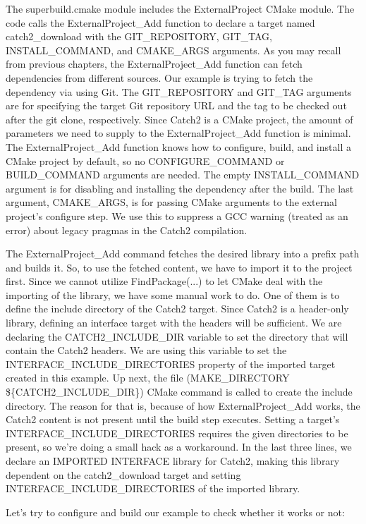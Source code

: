 The superbuild.cmake module includes the ExternalProject CMake module. The code calls the ExternalProject\_Add function to declare a target named catch2\_download with the GIT\_REPOSITORY, GIT\_TAG, INSTALL\_COMMAND, and CMAKE\_ARGS arguments. As you may recall from previous chapters, the ExternalProject\_Add function can fetch dependencies from different sources. Our example is trying to fetch the dependency via using Git. The GIT\_REPOSITORY and GIT\_TAG arguments are for specifying the target Git repository URL and the tag to be checked out after the git clone, respectively. Since Catch2 is a CMake project, the amount of parameters we need to supply to the ExternalProject\_Add function is minimal. The ExternalProject\_Add function knows how to configure, build, and install a CMake project by default, so no CONFIGURE\_COMMAND or BUILD\_COMMAND arguments are needed. The empty INSTALL\_COMMAND argument is for disabling and installing the dependency after the build. The last argument, CMAKE\_ARGS, is for passing CMake arguments to the external project's configure step. We use this to suppress a GCC warning (treated as an error) about legacy pragmas in the Catch2 compilation.

The ExternalProject\_Add command fetches the desired library into a prefix path and builds it. So, to use the fetched content, we have to import it to the project first. Since we cannot utilize FindPackage(...) to let CMake deal with the importing of the library, we have some manual work to do. One of them is to define the include directory of the Catch2 target. Since Catch2 is a header-only library, defining an interface target with the headers will be sufficient. We are declaring the CATCH2\_INCLUDE\_DIR variable to set the directory that will contain the Catch2 headers. We are using this variable to set the INTERFACE\_INCLUDE\_DIRECTORIES property of the imported target created in this example. Up next, the file (MAKE\_DIRECTORY \$\{CATCH2\_INCLUDE\_DIR\}) CMake command is called to create the include directory. The reason for that is, because of how ExternalProject\_Add works, the Catch2 content is not present until the build step executes. Setting a target's INTERFACE\_INCLUDE\_DIRECTORIES requires the given directories to be present, so we're doing a small hack as a workaround. In the last three lines, we declare an IMPORTED INTERFACE library for Catch2, making this library dependent on the catch2\_download target and setting INTERFACE\_INCLUDE\_DIRECTORIES of the imported library.

Let's try to configure and build our example to check whether it works or not:

